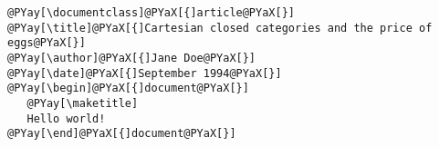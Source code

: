 \begin{Verbatim}[commandchars=@\[\]]
@PYay[\documentclass]@PYaX[{]article@PYaX[}]
@PYay[\title]@PYaX[{]Cartesian closed categories and the price of eggs@PYaX[}]
@PYay[\author]@PYaX[{]Jane Doe@PYaX[}]
@PYay[\date]@PYaX[{]September 1994@PYaX[}]
@PYay[\begin]@PYaX[{]document@PYaX[}]
   @PYay[\maketitle]
   Hello world!
@PYay[\end]@PYaX[{]document@PYaX[}]
\end{Verbatim}
